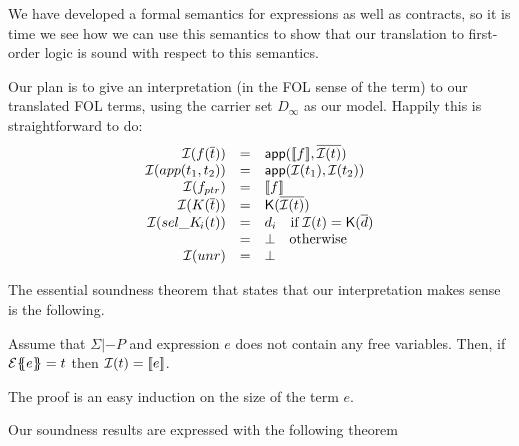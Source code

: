 We have developed a formal semantics for expressions as well as contracts, so it is time we 
see how we can use this semantics to show that our translation to first-order logic is sound 
with respect to this semantics. 

Our plan is to give an interpretation (in the FOL sense of the term) to our 
translated FOL terms, using the carrier set $D_\infty$ as our model. 
Happily this is straightforward to do:
\[\begin{array}{rcl}
   {\cal I}(f(\overline{t})) & = & \mathsf{app}([\![f]\!],\overline{{\cal I}(t)}) \\ 
   {\cal I}(app(t_1,t_2))     & = & \mathsf{app}({\cal I}(t_1), {\cal I}(t_2)) \\
   {\cal I}(f_{ptr})  & = & [\![f]\!] \\
   {\cal I}(K(\overline{t})) & = & \mathsf{K}(\overline{{\cal I}(t)}) \\ 
   {\cal I}(\mathop{sel\_K\!_{i}}(t)) & = &  d_i \quad \mbox{if}\; {\cal I}(t) = \mathsf{K}(\overline{d}) \\ 
                           & = & \bot \quad \mbox{otherwise} \\
  {\cal I}(unr)       & = & \bot 
\end{array}\]

The essential soundness theorem that states that our interpretation makes sense is
the following. 
\begin{theorem}\label{thm:interp-respect}
Assume that $\Sigma |- P$ and expression $e$ does not contain any free variables. 
Then, if ${\cal E}\{\!\!\{e\}\!\!\} = t$ then ${\cal I}(t) = [\![e]\!]$.
\end{theorem}
The proof is an easy induction on the size of the term $e$.

Our soundness results are expressed with the following theorem 

